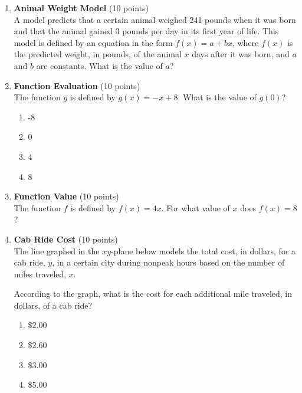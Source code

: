 \begin{enumerate}
  \newpage


  \item \textbf{Animal Weight Model} (10 points)\\
  A model predicts that a certain animal weighed 241 pounds when it was born and that the animal gained 3 pounds per day in its first year of life. This model is defined by an equation in the form $f(x)=a+bx$, where $f(x)$ is the predicted weight, in pounds, of the animal $x$ days after it was born, and $a$ and $b$ are constants. What is the value of $a$?
  \begin{subanswer}
  \end{subanswer}

  \item \textbf{Function Evaluation} (10 points)\\
  The function $g$ is defined by $g(x)=-x+8$. What is the value of $g(0)$?\\
  \begin{enumerate}[label=(\Alph*)]
    \item -8
    \item 0
    \item 4
    \item 8
  \end{enumerate}
  \begin{subanswer}
  \end{subanswer}

  \item \textbf{Function Value} (10 points)\\
  The function $f$ is defined by $f(x)=4x$. For what value of $x$ does $f(x)=8$?
  \begin{subanswer}
  \end{subanswer}

  \item \textbf{Cab Ride Cost} (10 points)\\
  The line graphed in the $xy$-plane below models the total cost, in dollars, for a cab ride, $y$, in a certain city during nonpeak hours based on the number of miles traveled, $x$.


  According to the graph, what is the cost for each additional mile traveled, in dollars, of a cab ride?\\
  \begin{enumerate}[label=(\Alph*)]
    \item \$2.00
    \item \$2.60
    \item \$3.00
    \item \$5.00
  \end{enumerate}
  \begin{subanswer}
  \end{subanswer}


\end{enumerate}

